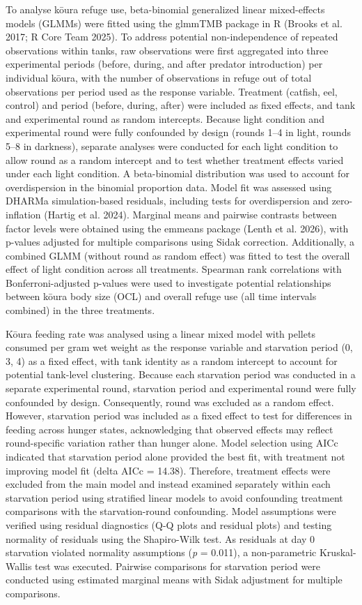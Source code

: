 \documentclass[
  12pt,
  a4paper,
  oneside]{scrbook}
\begin{document}
To analyse kōura refuge use, beta-binomial generalized linear
mixed-effects models (GLMMs) were fitted using the glmmTMB package in R
(Brooks et al. 2017; R Core Team 2025). To address potential
non-independence of repeated observations within tanks, raw observations
were first aggregated into three experimental periods (before, during,
and after predator introduction) per individual kōura, with the number
of observations in refuge out of total observations per period used as
the response variable. Treatment (catfish, eel, control) and period
(before, during, after) were included as fixed effects, and tank and
experimental round as random intercepts. Because light condition and
experimental round were fully confounded by design (rounds 1--4 in
light, rounds 5--8 in darkness), separate analyses were conducted for
each light condition to allow round as a random intercept and to test
whether treatment effects varied under each light condition. A
beta-binomial distribution was used to account for overdispersion in the
binomial proportion data. Model fit was assessed using DHARMa
simulation-based residuals, including tests for overdispersion and
zero-inflation ({Hartig et al.} 2024). Marginal means and pairwise
contrasts between factor levels were obtained using the emmeans package
(Lenth et al. 2026), with p-values adjusted for multiple comparisons
using Sidak correction. Additionally, a combined GLMM (without round as
random effect) was fitted to test the overall effect of light condition
across all treatments. Spearman rank correlations with
Bonferroni-adjusted p-values were used to investigate potential
relationships between kōura body size (OCL) and overall refuge use (all
time intervals combined) in the three treatments.

Kōura feeding rate was analysed using a linear mixed model with pellets
consumed per gram wet weight as the response variable and starvation
period (0, 3, 4) as a fixed effect, with tank identity as a random
intercept to account for potential tank-level clustering. Because each
starvation period was conducted in a separate experimental round,
starvation period and experimental round were fully confounded by
design. Consequently, round was excluded as a random effect. However,
starvation period was included as a fixed effect to test for differences
in feeding across hunger states, acknowledging that observed effects may
reflect round-specific variation rather than hunger alone. Model
selection using AICc indicated that starvation period alone provided the
best fit, with treatment not improving model fit (delta AICc = 14.38).
Therefore, treatment effects were excluded from the main model and
instead examined separately within each starvation period using
stratified linear models to avoid confounding treatment comparisons with
the starvation-round confounding. Model assumptions were verified using
residual diagnostics (Q-Q plots and residual plots) and testing
normality of residuals using the Shapiro-Wilk test. As residuals at day
0 starvation violated normality assumptions (\emph{p} = 0.011), a
non-parametric Kruskal-Wallis test was executed. Pairwise comparisons
for starvation period were conducted using estimated marginal means with
Sidak adjustment for multiple comparisons.
\end{document}
